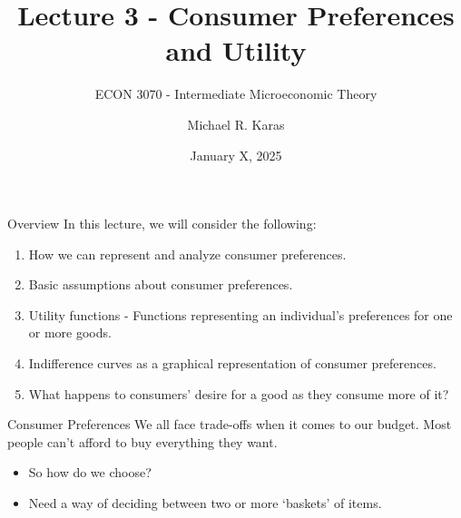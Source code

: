 \documentclass[12pt,t]{beamer}
\author{Michael R. Karas}
\title{Lecture 3 - Consumer Preferences and Utility}
\subtitle{ECON 3070 - Intermediate Microeconomic Theory}
\date{January X, 2025}
\begin{document}
\begin{frame}
  \titlepage
\end{frame}

\begin{frame}{Overview}
  In this lecture, we will consider the following:
  \begin{enumerate}
    \item How we can represent and analyze consumer preferences.
    \item Basic assumptions about consumer preferences.
    \item Utility functions  - Functions representing an individual's preferences for one or more goods.
    \item Indifference curves as a graphical representation of consumer preferences.
    \item What happens to consumers' desire for a good as they consume more of it?
  \end{enumerate}
\end{frame}


\begin{frame}{Consumer Preferences}
  We all face trade-offs when it comes to our budget. Most people can't afford to buy everything they want.

  \begin{itemize}
    \item So how do we choose?

    \item Need a way of deciding between two or more `baskets' of items.
  \end{itemize}
\end{frame}
\end{document}
